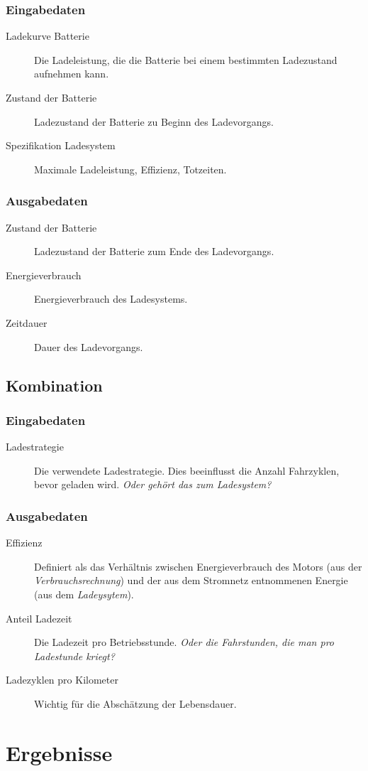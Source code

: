 \subsubsection{Eingabedaten}
\begin{description}
	\item[Ladekurve Batterie] Die Ladeleistung, die die Batterie bei einem bestimmten Ladezustand aufnehmen kann.
	\item[Zustand der Batterie] Ladezustand der Batterie zu Beginn des Ladevorgangs.
	\item[Spezifikation Ladesystem] Maximale Ladeleistung, Effizienz, Totzeiten.
\end{description}

\subsubsection{Ausgabedaten}
\begin{description}
	\item[Zustand der Batterie] Ladezustand der Batterie zum Ende des Ladevorgangs.
	\item[Energieverbrauch] Energieverbrauch des Ladesystems.
	\item[Zeitdauer] Dauer des Ladevorgangs.
\end{description}

\subsection{Kombination}

\subsubsection{Eingabedaten}
\begin{description}
	\item[Ladestrategie] Die verwendete Ladestrategie. Dies beeinflusst die Anzahl Fahrzyklen, bevor geladen wird. \emph{Oder gehört das zum Ladesystem?}
\end{description}

\subsubsection{Ausgabedaten}
\begin{description}
	\item[Effizienz] Definiert als das Verhältnis zwischen Energieverbrauch des Motors (aus der \emph{Verbrauchsrechnung}) und der aus dem Stromnetz entnommenen Energie (aus dem \emph{Ladeysytem}).
	\item[Anteil Ladezeit] Die Ladezeit pro Betriebsstunde. \emph{Oder die Fahrstunden, die man pro Ladestunde kriegt?}
	\item[Ladezyklen pro Kilometer] Wichtig für die Abschätzung der Lebensdauer.
\end{description}

\section{Ergebnisse}